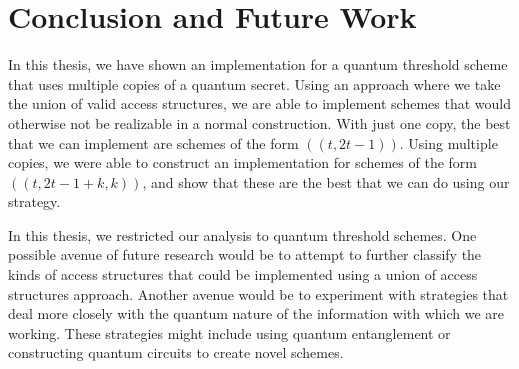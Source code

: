 \chapter{Conclusion and Future Work}
\label{conclusion}

In this thesis, we have shown an implementation for a quantum threshold scheme that uses multiple copies of a quantum secret. Using an approach where we take the union of valid access structures, we are able to implement schemes that would otherwise not be realizable in a normal construction. With just one copy, the best that we can implement are schemes of the form $((t,2t-1))$. Using multiple copies, we were able to construct an implementation for schemes of the form $((t,2t-1+k,k))$, and show that these are the best that we can do using our strategy.

In this thesis, we restricted our analysis to quantum threshold schemes. One possible avenue of future research would be to attempt to further classify the kinds of access structures that could be implemented using a union of access structures approach. Another avenue would be to experiment with strategies that deal more closely with the quantum nature of the information with which we are working. These strategies might include using quantum entanglement or constructing quantum circuits to create novel schemes.